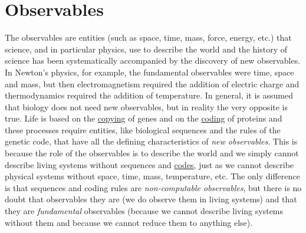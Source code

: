 \documentclass[12pt]{article}
\begin{document}
\section{Observables}
The observables are entities (such as space, time, mass, force, energy, etc.) that science, and in particular physics, use to describe the world and the history of science has been systematically accompanied by the discovery of new observables. In Newton's physics, for example, the fundamental observables were time, space and mass, but then electromagnetism required the addition of electric charge and thermodynamics required the addition of temperature. In general, it is assumed that biology does not need new observables, but in reality the very opposite is true. Life is based on the \hyperlink{copying_and_coding}{copying} of genes and on the \hyperlink{copying_and_coding}{coding} of proteins and these processes require entities, like biological sequences and the rules of the genetic code, that have all the defining characteristics of \textit{new observables}. This is because the role of the observables is to describe the world and we simply cannot describe living systems without sequences and \hyperlink{code}{codes}, just as we cannot describe physical systems without space, time, mass, temperature, etc. The only difference is that sequences and coding rules are \textit{non-computable observables}, but there is no doubt that observables they are (we do observe them in living systems) and that they are \textit{fundamental} observables (because we cannot describe living systems without them and because we cannot reduce them to anything else). 


\hypertarget{organic_codes}{}
\end{document}
